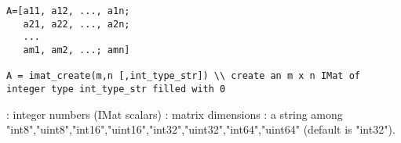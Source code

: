 
\begin{mandesc}
\end{mandesc}
\begin{calling_sequence}
\begin{verbatim}
A=[a11, a12, ..., a1n;
   a21, a22, ..., a2n;
   ...
   am1, am2, ...; amn]

A = imat_create(m,n [,int_type_str]) \\ create an m x n IMat of integer type int_type_str filled with 0
\end{verbatim}
\end{calling_sequence}
\begin{parameters}
  \begin{varlist}
    : integer numbers (IMat scalars)
    : matrix dimensions
    : a string among  "int8","uint8","int16","uint16","int32","uint32","int64","uint64"
         (default is "int32").
  \end{varlist}
\end{parameters}

